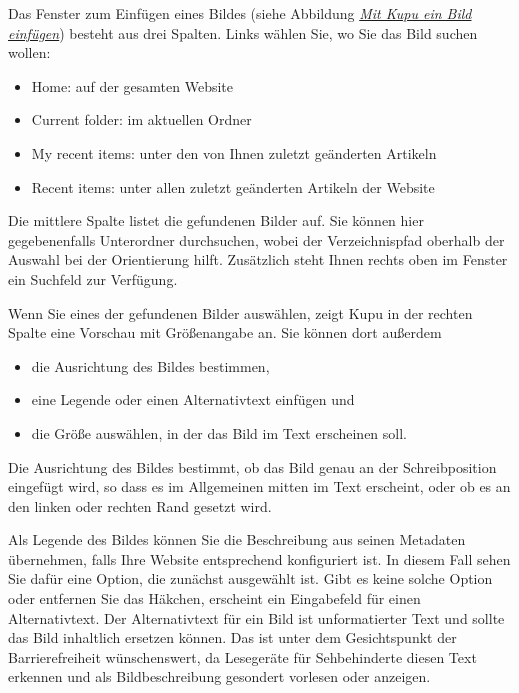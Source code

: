 \documentclass[a4paper,12pt,ngerman]{manual}
\begin{document}
Das Fenster zum Einfügen eines Bildes (siehe Abbildung \hyperlink{fig-kupu-bild}{\emph{Mit Kupu ein Bild einfügen}})
besteht aus drei Spalten. Links wählen Sie, wo Sie das Bild suchen wollen:
\begin{itemize}
\item {} 
Home: auf der gesamten Website

\item {} 
Current folder: im aktuellen Ordner

\item {} 
My recent items: unter den von Ihnen zuletzt geänderten Artikeln

\item {} 
Recent items: unter allen zuletzt geänderten Artikeln der Website

\end{itemize}

Die mittlere Spalte listet die gefundenen Bilder auf. Sie können hier
gegebenenfalls Unterordner durchsuchen, wobei der Verzeichnispfad oberhalb der
Auswahl bei der Orientierung hilft. Zusätzlich steht Ihnen rechts oben im Fenster ein
Suchfeld zur Verfügung.

Wenn Sie eines der gefundenen Bilder auswählen, zeigt Kupu in der rechten
Spalte eine Vorschau mit Größenangabe an. Sie können dort außerdem
\begin{itemize}
\item {} 
die Ausrichtung des Bildes bestimmen,

\item {} 
eine Legende oder einen Alternativtext einfügen und

\item {} 
die Größe auswählen, in der das Bild im Text erscheinen soll.

\end{itemize}

Die Ausrichtung des Bildes bestimmt, ob das Bild genau an der Schreibposition
eingefügt wird, so dass es im Allgemeinen mitten im Text erscheint, oder ob es
an den linken oder rechten Rand gesetzt wird.

Als Legende des Bildes können Sie die Beschreibung aus seinen Metadaten
übernehmen, falls Ihre Website entsprechend konfiguriert ist.
In diesem Fall sehen Sie dafür eine Option, die
zunächst ausgewählt ist. Gibt es keine solche Option oder entfernen Sie das
Häkchen, erscheint ein Eingabefeld für einen Alternativtext. Der
Alternativtext für ein Bild ist unformatierter Text und sollte das Bild
inhaltlich ersetzen können. Das ist unter dem Gesichtspunkt der
Barrierefreiheit wünschenswert, da Lesegeräte für Sehbehinderte diesen Text
erkennen und als Bildbeschreibung gesondert vorlesen oder anzeigen.
\end{document}
